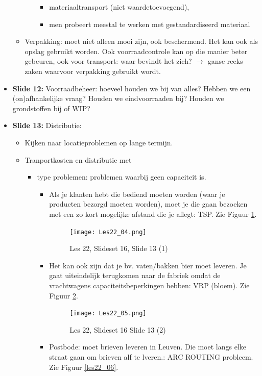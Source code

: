 \documentclass[10pt,a4paper]{report}
\begin{document}
\begin{itemize}
\begin{itemize}
\begin{itemize}
\begin{itemize}
\item materiaaltransport (niet waardetoevoegend), 
\item men probeert meestal te werken met gestandardiseerd materiaal
\end{itemize}
\end{itemize}
\item Verpakking: moet niet alleen mooi zijn, ook beschermend. Het kan ook als opslag gebruikt worden. Ook voorraadcontrole kan op die manier beter gebeuren, ook voor transport: waar bevindt het zich? $\rightarrow$ ganse reeks zaken waarvoor verpakking gebruikt wordt.
\end{itemize}
\item \textbf{Slide 12:} Voorraadbeheer: hoeveel houden we bij van alles? Hebben we een (on)afhankelijke vraag? Houden we eindvoorraaden bij? Houden we grondstoffen bij of WIP? 
\item \textbf{Slide 13:} Distributie: 
\begin{itemize}
\item Kijken naar locatieproblemen op lange termijn.
\item Tranportkosten en distributie met 
\begin{itemize}
\item type problemen: problemen waarbij geen capaciteit is. 
\begin{itemize}
\item Als je klanten hebt die bediend moeten worden (waar je producten bezorgd moeten worden), moet je die gaan bezoeken met een zo kort mogelijke afstand die je aflegt: TSP. Zie Figuur \ref{les22_04}.

\begin{figure}[h!]
\centering
\texttt{[image: Les22\_04.png]}
\caption{Les 22, Slideset 16, Slide 13 (1)} 
\label{les22_04}
\end{figure}
			
\item Het kan ook zijn dat je bv. vaten/bakken bier moet leveren. Je gaat uiteindelijk terugkomen naar de fabriek omdat de vrachtwagens capaciteitsbeperkingen hebben: VRP (bloem). Zie Figuur \ref{les22_05}.

\begin{figure}[h!]
\centering
\texttt{[image: Les22\_05.png]}
\caption{Les 22, Slideset 16 Slide 13 (2)} 
\label{les22_05}
\end{figure}		
			
\item Postbode: moet brieven leveren in Leuven. Die moet langs elke straat gaan om brieven alf te lveren.: ARC ROUTING probleem. Zie Figuur \ref{les22_06}.


\end{itemize}
\end{itemize}
\end{itemize}
\end{itemize}
\end{document}
